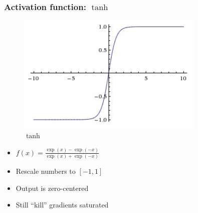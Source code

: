\documentclass{beamer}
\begin{document}
\begin{frame}
  \frametitle{Activation function: $\tanh$}

  \begin{minipage}{0.48\textwidth}
    \begin{figure}
      \centering
      \includegraphics[width=0.8\textwidth]{tanh.jpeg}
      \caption{$\tanh$}
    \end{figure}
  \end{minipage}
  \begin{minipage}{0.48\textwidth}
    \begin{itemize}
      \item $f(x)=\frac{\exp(x)-\exp(-x)}{\exp(x)+\exp(-x)}$
      \item[\ding{51}] Rescale numbers to $[-1,1]$
      \item[\ding{51}] Output is zero-centered
      \item[\ding{55}] Still ``kill'' gradients saturated
    \end{itemize}
  \end{minipage}
\end{frame}
\end{document}
